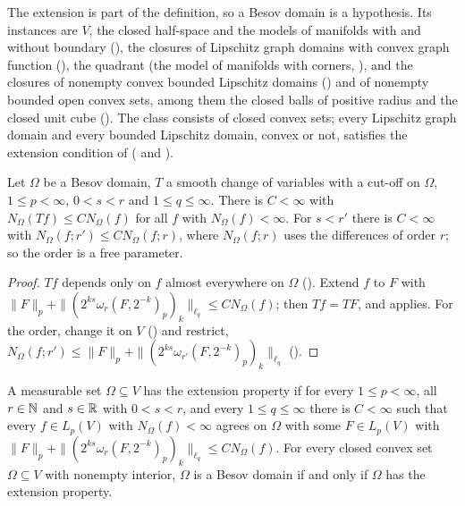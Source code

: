 The extension is part of the definition, so a Besov domain is a hypothesis. Its instances are
$V$, the closed half-space and the models of manifolds with and without boundary
(), the closures of Lipschitz graph domains with convex graph
function (), the quadrant (the model of manifolds with corners,
), and the closures of nonempty convex bounded Lipschitz domains
() and of nonempty bounded open convex sets, among them
the closed balls of positive radius and the closed unit cube ().
The class consists of closed convex sets; every Lipschitz graph domain and every bounded
Lipschitz domain, convex or not, satisfies the extension condition of
 ( and
).

\begin{theorem}
\label{thm:besov-domain-invariance}
\leanok
{}
Let $\Omega$ be a Besov domain, $T$ a smooth change of variables with a cut-off on $\Omega$,
$1 \leq p < \infty$, $0 < s < r$ and $1 \leq q \leq \infty$. There is $C < \infty$ with
$N_\Omega(T f) \leq C N_\Omega(f)$ for all $f$ with $N_\Omega(f) < \infty$. For $s < r'$ there is
$C < \infty$ with $N_\Omega(f; r') \leq C N_\Omega(f; r)$, where $N_\Omega(f; r)$ uses the
differences of order $r$; so the order is a free parameter.
\end{theorem}

\begin{proof}
\leanok
$T f$ depends only on $f$ almost everywhere on $\Omega$ (). Extend $f$
to $F$ with $\|F\|_p + \|(2^{ks} \omega_r(F, 2^{-k})_p)_k\|_{\ell_q} \leq C N_\Omega(f)$; then
$T f = T F$, and  applies. For the order, change it on $V$
() and restrict, $N_\Omega(f; r') \leq
\|F\|_p + \|(2^{ks} \omega_{r'}(F, 2^{-k})_p)_k\|_{\ell_q}$ ().
\end{proof}

\begin{definition}
\label{def:besov-extension-property}
\leanok
{}
A measurable set $\Omega \subseteq V$ has the extension property if for every $1 \leq p < \infty$,
all $r \in \mathbb{N}$ and $s \in \mathbb{R}$ with $0 < s < r$, and every $1 \leq q \leq \infty$ there is
$C < \infty$ such that every $f \in L_p(V)$ with $N_\Omega(f) < \infty$ agrees on $\Omega$ with
some $F \in L_p(V)$ with $\|F\|_p + \|(2^{ks} \omega_r(F, 2^{-k})_p)_k\|_{\ell_q} \leq
C N_\Omega(f)$. For every closed convex set $\Omega \subseteq V$ with nonempty interior, $\Omega$ is
a Besov domain if and only if $\Omega$ has the extension property.
\end{definition}

